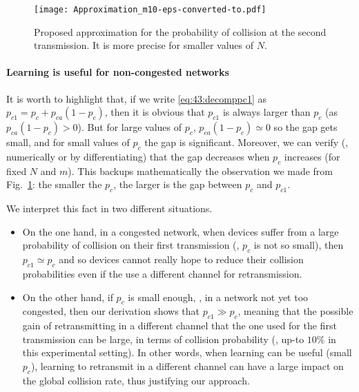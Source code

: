 \begin{figure}[htp!]  %
	\centering
	\texttt{[image: Approximation\_m10-eps-converted-to.pdf]}
	\caption[Proposed approximation for the probability of collision at the second transmission]{Proposed approximation for the probability of collision at the second transmission. It is more precise for smaller values of $N$.}
	\label{fig:43:Approximation_m10}
\end{figure}


\paragraph{Learning is useful for non-congested networks}

It is worth to highlight that, if we write \eqref{eq:43:decomppc1} as $p_{c1} = p_c + p_{ca} \left(1-p_c\right)$,
then it is obvious that $p_{c1}$ is always larger than $p_c$ (as $p_{ca} \left(1-p_c\right) > 0$).
But for large values of $p_c$, $p_{ca}\left(1-p_c\right) \simeq 0$ so the gap gets small,
and for small values of $p_c$ the gap is significant.
Moreover, we can verify (\eg, numerically or by differentiating)
that the gap decreases when $p_c$ increases (for fixed $N$ and $m$).
This backups mathematically the observation we made from Fig.~\ref{fig:43:Approximation_m10}:
the smaller the $p_c$, the larger is the gap between $p_c$ and $p_{c1}$.

We interpret this fact in two different situations.
\begin{itemize}
	\item
	On the one hand, in a congested network, when devices suffer from a large probability of collision on their first transmission (\ie, $p_c$ is not so small), then $p_{c1}\simeq p_c$ and so devices cannot really hope to reduce their collision probabilities even if the use a different channel for retransmission.
	\item
	On the other hand, if $p_c$ is small enough, \ie, in a network not yet too congested, then our derivation shows that $p_{c1} \gg p_c$, meaning that the possible gain of retransmitting in a different channel that the one used for the first transmission can be large, in terms of collision probability (\eg, up-to $10\%$ in this experimental setting).
	In other words, when learning can be useful (small $p_c$), learning to retransmit in a different channel can have a large impact on the global collision rate,
	thus justifying our approach.
\end{itemize}


